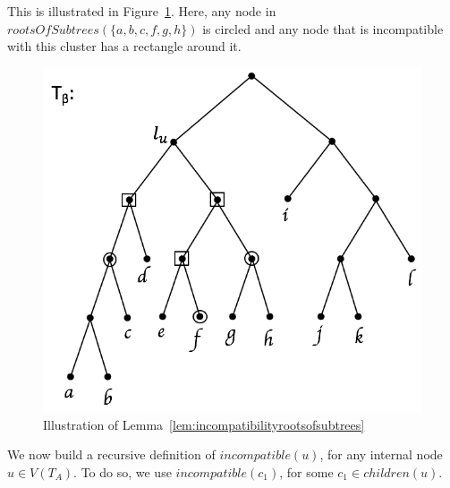 \documentclass{article}
\begin{document}
    This is illustrated in Figure~\ref{fig:rootsofsubtrees}. Here, any node in $rootsOfSubtrees(\{a, b, c, f, g, h\})$ is circled and any node that is incompatible with this cluster has a rectangle around it.

    \begin{figure}[h]
        \includegraphics[scale=0.5]{rootsofsubtrees}
        \centering
        \caption{Illustration of Lemma~\ref{lem:incompatibilityrootsofsubtrees}}
        \label{fig:rootsofsubtrees}
    \end{figure}

    We now build a recursive definition of $incompatible(u)$, for any internal node $u \in V(T_A)$. To do so, we use $incompatible(c_1)$, for some $c_1 \in children(u)$.
    \newline
\end{document}
